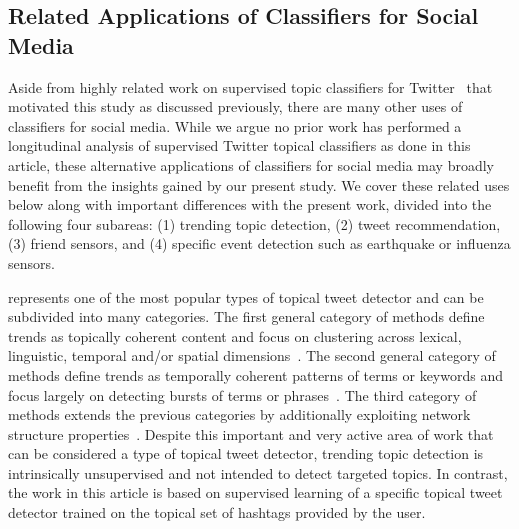 \subsection*{Related Applications of Classifiers for Social Media} 

Aside from highly related work on supervised topic classifiers for Twitter~\cite{lin2011smoothing,yang2014large,magdy} that motivated this study as discussed previously, there are many other uses of classifiers for social media.  While we
argue no prior work has performed a longitudinal analysis of supervised Twitter topical 
classifiers as done in this article, these alternative applications of classifiers for social media may broadly benefit from the insights gained by our present study.  We cover these related uses below along with important differences with the present work, divided into the following four subareas: (1) trending topic detection, (2) tweet recommendation, (3) friend
sensors, and (4) specific event detection such as earthquake or
influenza sensors.   

\vspace{2mm}
 represents one of the most popular
types of topical tweet detector and can be subdivided into many categories.  The
first general category of methods define trends as topically coherent
content and focus on clustering across lexical, linguistic, temporal
and/or spatial
dimensions~\cite{petrovic,ishikawa,murata,becker,tweetmotif,wangLee}.
The second general category of methods define trends as temporally
coherent patterns of terms or keywords and focus largely on detecting
bursts of terms or
phrases~\cite{mathioudakis,cuiZhang,zhaoSports,nichols,aiello}.
%
The third category of methods extends the previous categories by
additionally exploiting network structure properties~\cite{budak}.
Despite this important and very active area of work that can be
considered a type of topical tweet detector, trending topic detection is
intrinsically unsupervised and not intended to detect targeted topics.
In contrast, the work in this article is based on supervised learning of
a specific topical tweet detector trained on the topical set of
hashtags provided by the user.

